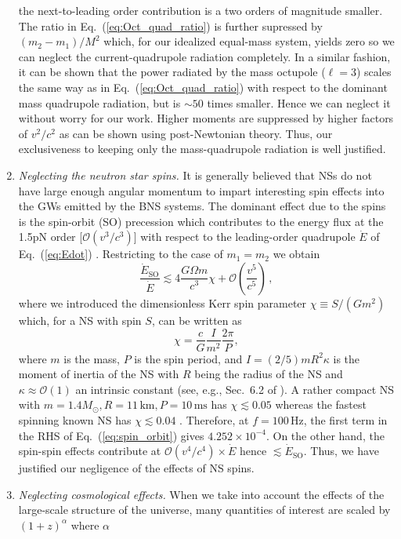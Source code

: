 \documentclass[11pt,a4paper]{article}
\newcommand{\f}{\frac}
\newcommand{\be}{\begin{equation}}
\newcommand{\ee}{\end{equation}}
\newcommand{\ord}{\mathcal{O}}
\begin{document}
\begin{enumerate}
the next-to-leading order contribution is a two orders of magnitude smaller.
The ratio in Eq.~(\ref{eq:Oct_quad_ratio}) is further supressed by $(m_2-m_1)/M^2$ which, for our idealized equal-mass system, 
yields zero so we can neglect the current-quadrupole radiation completely. In a similar fashion, it can be shown that the power radiated by the mass octupole ($\ell=3$)
scales the same way as in Eq.~(\ref{eq:Oct_quad_ratio}) with respect to the dominant mass quadrupole radiation, but is $\sim 50$ times smaller. 
Hence we can neglect it without worry for our work. Higher moments are suppressed by higher factors of $v^2/c^2$ as can be shown using post-Newtonian theory. 
Thus, our exclusiveness to keeping only the mass-quadrupole radiation is well justified.
 
%
\item {\it Neglecting the neutron star spins.}
It is generally believed that NSs do not have large enough angular momentum to impart interesting spin effects into the GWs emitted by the BNS systems.
The dominant effect due to the spins is the spin-orbit (SO) precession which contributes to the energy flux at the 1.5pN order [$\ord(v^3/c^3)$] with respect to the leading-order quadrupole $\dot{E}$ of Eq.~(\ref{eq:Edot}) \cite{Blanchet_LRR}. 
Restricting to the case of $m_1=m_2$ we obtain
%
\be
\f{\dot{E}_{\text{SO}}}{\dot{E}} \lesssim 4 \f{G\Omega m}{c^3}\chi + \ord\left(\f{v^5}{c^5}\right) \label{eq:spin_orbit}\, ,
\ee
%
where we introduced the dimensionless Kerr spin parameter $\chi\equiv {S}/({G m^2})$ which, for a NS with spin $S$, can be written as
%
\be
\chi=\f{c}{G} \f{I}{m^2} \f{2\pi}{P}, \label{eq:NS_spin}
\ee
%
where $m$ is the mass, $P$ is the spin period, and $ I = (2/5) m R^2 \kappa$ is the moment of inertia of the NS with $R$ being the radius of the NS and $\kappa \approx \ord(1)$ an intrinsic constant (see, e.g., Sec.~6.2 of \cite{Colpi_Sesana}). 
A rather compact NS with $m=1.4 M_\odot, R=11\,\text{km}, P= 10\,\text{ms}$ has $\chi\lesssim 0.05$ whereas
the fastest spinning known NS has $\chi\lesssim 0.04$ \cite{FastestNSspin}.
Therefore, at $f= 100\,$Hz, the first term in the RHS of Eq.~(\ref{eq:spin_orbit}) gives $4.252\times 10^{-4}$. 
On the other hand, the spin-spin effects contribute at $\ord(v^4/c^4)\times\dot{E}$ hence $\lesssim \dot{E}_\text{SO}$.
Thus, we have justified our negligence of the effects of NS spins.
%
\item {\it Neglecting cosmological effects.}
When we take into account the effects of the large-scale structure of the universe, many quantities of interest are scaled by $(1+z)^\alpha$ where $\alpha$

\end{enumerate}
\end{document}
